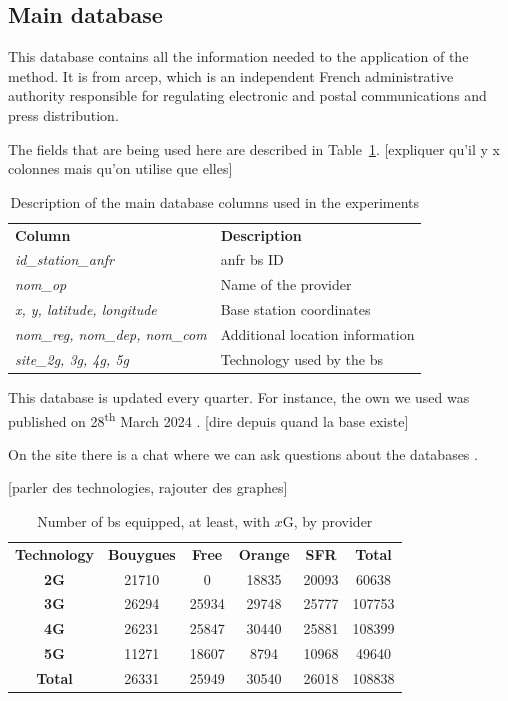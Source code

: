 \documentclass[lettersize,journal,english]{IEEEtran}
\begin{document}
\subsection{Main database}
This database \cite{main_database} contains all the information needed to the application of the method. It is from
\acrfull{arcep}, which is an independent French administrative authority responsible for regulating electronic and postal 
communications and press distribution.

The fields that are being used here are described in Table~\ref{table:data_columns}. [expliquer qu'il y x colonnes mais qu'on utilise que elles]
\begin{table}[!b]
    \centering
    \caption{Description of the main database columns used in the experiments}
    \label{table:data_columns}
    \begin{tabular}{ll}
        \toprule
        \textbf{Column} & \textbf{Description} \\
        \cmidrule(lr){1-2}
        \textsl{id\_station\_anfr} & \acrshort{anfr} \acrshort{bs} ID \\ 
        \textsl{nom\_op} & Name of the provider \\
        \textsl{x, y, latitude, longitude} & Base station coordinates \\ 
        \textsl{nom\_reg, nom\_dep, nom\_com} & Additional location information \\  
        \textsl{site\_2g, 3g, 4g, 5g} & Technology used by the \acrshort{bs} \\ 
        \bottomrule
    \end{tabular}
\end{table}

This database is updated every quarter. For instance, the own we used was published on 28\textsuperscript{th} March 2024 \cite{main_database_hist}. [dire depuis quand la base existe]

On the site there is a chat where we can ask questions about the databases \cite{main_database_chat}.

[parler des technologies, rajouter des graphes]

\begin{table}[!t]
    \centering
    \caption{Number of \acrfull{bs} equipped, at least, with $x$G, by provider}
    \label{table:techno_numbers}
    \begin{tabular}{cccccc}
        \toprule
        \textbf{Technology} & \textbf{Bouygues} & \textbf{Free} & \textbf{Orange} & \textbf{SFR} & \textbf{Total} \\
        \cmidrule(lr){1-6}
        \textbf{2G} & 21710 & 0 & 18835 & 20093 & 60638 \\
        \textbf{3G} & 26294 & 25934 & 29748 & 25777 & 107753 \\
        \textbf{4G} & 26231 & 25847 & 30440 & 25881 & 108399 \\
        \textbf{5G} & 11271 & 18607 & 8794 & 10968 & 49640 \\
        \textbf{Total} & 26331 & 25949 & 30540 & 26018 & 108838 \\
        \bottomrule
    \end{tabular}
\end{table}
\end{document}
